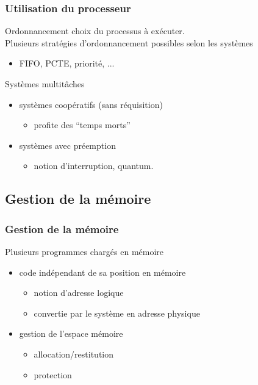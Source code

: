 \begin{frame}
\frametitle{Utilisation du processeur} 
Ordonnancement  choix du processus à exécuter.\\
\vspace{0.5cm}
Plusieurs stratégies d'ordonnancement possibles selon les systèmes
\begin{itemize}
\item FIFO, PCTE, priorité, ...
\end{itemize}
\vspace{0.5cm}

Systèmes multitâches
\begin{itemize}
\item systèmes coopératifs (sans réquisition)
  \begin{itemize}
  \item profite des ``temps morts'' 
  \end{itemize}
\item systèmes avec préemption
  \begin{itemize}
  \item notion d'interruption, quantum. 
  \end{itemize}
\end{itemize}
\end{frame}

\subsection{Gestion de la mémoire}
\begin{frame}
  \frametitle{Gestion de la mémoire}
  Plusieurs programmes chargés en mémoire
  \vspace{0.5cm}
  \begin{itemize}
  \item code indépendant de sa position en mémoire
    \normalsize{
      \begin{itemize}
      \item notion d'adresse logique
      \item convertie par le système en adresse physique
      \end{itemize}}
  \vspace{0.5cm}
  \item gestion de l'espace mémoire
    \normalsize{
      \begin{itemize}
      \item allocation/restitution 
      \item protection
      \end{itemize}}
  \end{itemize}
\end{frame}

